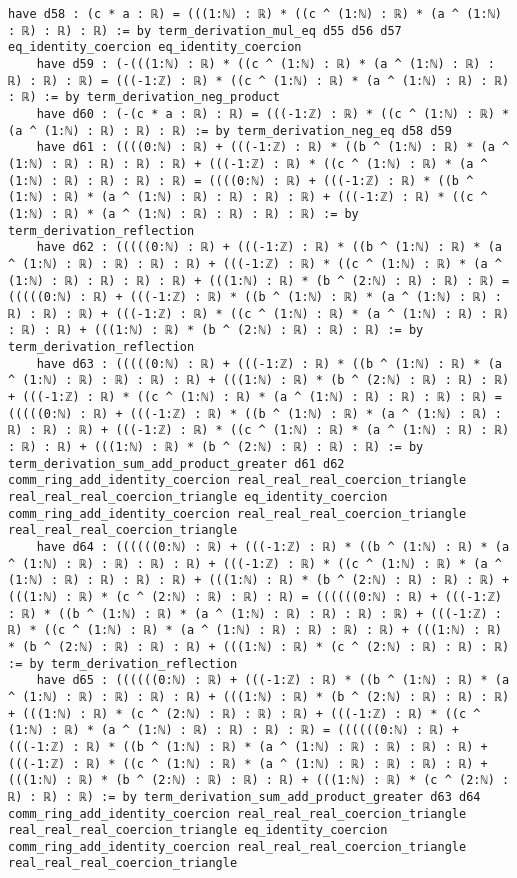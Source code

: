 \documentclass{article}
\begin{document}
\begin{tcolorbox}[colback=white!10, width=\linewidth]
\begin{lstlisting}[language=Lean4]
    have d58 : (c * a : ℝ) = (((1:ℕ) : ℝ) * ((c ^ (1:ℕ) : ℝ) * (a ^ (1:ℕ) : ℝ) : ℝ) : ℝ) := by term_derivation_mul_eq d55 d56 d57 eq_identity_coercion eq_identity_coercion
    have d59 : (-(((1:ℕ) : ℝ) * ((c ^ (1:ℕ) : ℝ) * (a ^ (1:ℕ) : ℝ) : ℝ) : ℝ) : ℝ) = (((-1:ℤ) : ℝ) * ((c ^ (1:ℕ) : ℝ) * (a ^ (1:ℕ) : ℝ) : ℝ) : ℝ) := by term_derivation_neg_product
    have d60 : (-(c * a : ℝ) : ℝ) = (((-1:ℤ) : ℝ) * ((c ^ (1:ℕ) : ℝ) * (a ^ (1:ℕ) : ℝ) : ℝ) : ℝ) := by term_derivation_neg_eq d58 d59
    have d61 : ((((0:ℕ) : ℝ) + (((-1:ℤ) : ℝ) * ((b ^ (1:ℕ) : ℝ) * (a ^ (1:ℕ) : ℝ) : ℝ) : ℝ) : ℝ) + (((-1:ℤ) : ℝ) * ((c ^ (1:ℕ) : ℝ) * (a ^ (1:ℕ) : ℝ) : ℝ) : ℝ) : ℝ) = ((((0:ℕ) : ℝ) + (((-1:ℤ) : ℝ) * ((b ^ (1:ℕ) : ℝ) * (a ^ (1:ℕ) : ℝ) : ℝ) : ℝ) : ℝ) + (((-1:ℤ) : ℝ) * ((c ^ (1:ℕ) : ℝ) * (a ^ (1:ℕ) : ℝ) : ℝ) : ℝ) : ℝ) := by term_derivation_reflection
    have d62 : (((((0:ℕ) : ℝ) + (((-1:ℤ) : ℝ) * ((b ^ (1:ℕ) : ℝ) * (a ^ (1:ℕ) : ℝ) : ℝ) : ℝ) : ℝ) + (((-1:ℤ) : ℝ) * ((c ^ (1:ℕ) : ℝ) * (a ^ (1:ℕ) : ℝ) : ℝ) : ℝ) : ℝ) + (((1:ℕ) : ℝ) * (b ^ (2:ℕ) : ℝ) : ℝ) : ℝ) = (((((0:ℕ) : ℝ) + (((-1:ℤ) : ℝ) * ((b ^ (1:ℕ) : ℝ) * (a ^ (1:ℕ) : ℝ) : ℝ) : ℝ) : ℝ) + (((-1:ℤ) : ℝ) * ((c ^ (1:ℕ) : ℝ) * (a ^ (1:ℕ) : ℝ) : ℝ) : ℝ) : ℝ) + (((1:ℕ) : ℝ) * (b ^ (2:ℕ) : ℝ) : ℝ) : ℝ) := by term_derivation_reflection
    have d63 : (((((0:ℕ) : ℝ) + (((-1:ℤ) : ℝ) * ((b ^ (1:ℕ) : ℝ) * (a ^ (1:ℕ) : ℝ) : ℝ) : ℝ) : ℝ) + (((1:ℕ) : ℝ) * (b ^ (2:ℕ) : ℝ) : ℝ) : ℝ) + (((-1:ℤ) : ℝ) * ((c ^ (1:ℕ) : ℝ) * (a ^ (1:ℕ) : ℝ) : ℝ) : ℝ) : ℝ) = (((((0:ℕ) : ℝ) + (((-1:ℤ) : ℝ) * ((b ^ (1:ℕ) : ℝ) * (a ^ (1:ℕ) : ℝ) : ℝ) : ℝ) : ℝ) + (((-1:ℤ) : ℝ) * ((c ^ (1:ℕ) : ℝ) * (a ^ (1:ℕ) : ℝ) : ℝ) : ℝ) : ℝ) + (((1:ℕ) : ℝ) * (b ^ (2:ℕ) : ℝ) : ℝ) : ℝ) := by term_derivation_sum_add_product_greater d61 d62 comm_ring_add_identity_coercion real_real_real_coercion_triangle real_real_real_coercion_triangle eq_identity_coercion comm_ring_add_identity_coercion real_real_real_coercion_triangle real_real_real_coercion_triangle
    have d64 : ((((((0:ℕ) : ℝ) + (((-1:ℤ) : ℝ) * ((b ^ (1:ℕ) : ℝ) * (a ^ (1:ℕ) : ℝ) : ℝ) : ℝ) : ℝ) + (((-1:ℤ) : ℝ) * ((c ^ (1:ℕ) : ℝ) * (a ^ (1:ℕ) : ℝ) : ℝ) : ℝ) : ℝ) + (((1:ℕ) : ℝ) * (b ^ (2:ℕ) : ℝ) : ℝ) : ℝ) + (((1:ℕ) : ℝ) * (c ^ (2:ℕ) : ℝ) : ℝ) : ℝ) = ((((((0:ℕ) : ℝ) + (((-1:ℤ) : ℝ) * ((b ^ (1:ℕ) : ℝ) * (a ^ (1:ℕ) : ℝ) : ℝ) : ℝ) : ℝ) + (((-1:ℤ) : ℝ) * ((c ^ (1:ℕ) : ℝ) * (a ^ (1:ℕ) : ℝ) : ℝ) : ℝ) : ℝ) + (((1:ℕ) : ℝ) * (b ^ (2:ℕ) : ℝ) : ℝ) : ℝ) + (((1:ℕ) : ℝ) * (c ^ (2:ℕ) : ℝ) : ℝ) : ℝ) := by term_derivation_reflection
    have d65 : ((((((0:ℕ) : ℝ) + (((-1:ℤ) : ℝ) * ((b ^ (1:ℕ) : ℝ) * (a ^ (1:ℕ) : ℝ) : ℝ) : ℝ) : ℝ) + (((1:ℕ) : ℝ) * (b ^ (2:ℕ) : ℝ) : ℝ) : ℝ) + (((1:ℕ) : ℝ) * (c ^ (2:ℕ) : ℝ) : ℝ) : ℝ) + (((-1:ℤ) : ℝ) * ((c ^ (1:ℕ) : ℝ) * (a ^ (1:ℕ) : ℝ) : ℝ) : ℝ) : ℝ) = ((((((0:ℕ) : ℝ) + (((-1:ℤ) : ℝ) * ((b ^ (1:ℕ) : ℝ) * (a ^ (1:ℕ) : ℝ) : ℝ) : ℝ) : ℝ) + (((-1:ℤ) : ℝ) * ((c ^ (1:ℕ) : ℝ) * (a ^ (1:ℕ) : ℝ) : ℝ) : ℝ) : ℝ) + (((1:ℕ) : ℝ) * (b ^ (2:ℕ) : ℝ) : ℝ) : ℝ) + (((1:ℕ) : ℝ) * (c ^ (2:ℕ) : ℝ) : ℝ) : ℝ) := by term_derivation_sum_add_product_greater d63 d64 comm_ring_add_identity_coercion real_real_real_coercion_triangle real_real_real_coercion_triangle eq_identity_coercion comm_ring_add_identity_coercion real_real_real_coercion_triangle real_real_real_coercion_triangle

\end{lstlisting}
\end{tcolorbox}
\end{document}
